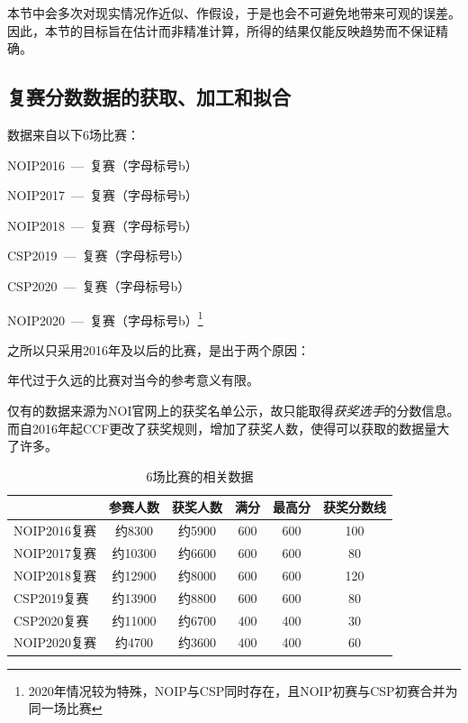     本节中会多次对现实情况作近似、作假设，于是也会不可避免地带来可观的误差。因此，本节的目标旨在估计而非精准计算，所得的结果仅能反映趋势而不保证精确。

    \subsection{复赛分数数据的获取、加工和拟合}\label{sec:dataPreprocessingOfNOIP}

        数据来自以下6场比赛：
        \begin{asparaitem}
            \item NOIP2016\ ---\ 复赛（字母标号b）
            \item NOIP2017\ ---\ 复赛（字母标号b）
            \item NOIP2018\ ---\ 复赛（字母标号b）
            \item CSP2019\ ---\ 复赛（字母标号b）
            \item CSP2020\ ---\ 复赛（字母标号b）
            \item NOIP2020\ ---\ 复赛（字母标号b）\footnote{2020年情况较为特殊，NOIP与CSP同时存在，且NOIP初赛与CSP初赛合并为同一场比赛}
        \end{asparaitem}

        \vspace{1.5ex}

        之所以只采用2016年及以后的比赛，是出于两个原因：
        \begin{asparaitem}
            \item 年代过于久远的比赛对当今的参考意义有限。
            \item 仅有的数据来源为NOI官网上的获奖名单公示，故只能取得\emph{获奖选手}的分数信息。而自2016年起CCF更改了获奖规则，增加了获奖人数，使得可以获取的数据量大了许多。
        \end{asparaitem}

        \vspace{1.5ex}

        \begin{table}\footnotesize
            \centering
            \begin{tabular}{@{}lccccc@{}}
                \toprule
                    & \multicolumn{1}{l}{参赛人数} & \multicolumn{1}{l}{获奖人数} & \multicolumn{1}{l}{满分} & \multicolumn{1}{l}{最高分} & \multicolumn{1}{l}{获奖分数线} \\ \midrule
                NOIP2016复赛 & 约8300  & 约5900 & 600 & 600 & 100 \\
                NOIP2017复赛 & 约10300 & 约6600 & 600 & 600 & 80  \\
                NOIP2018复赛 & 约12900 & 约8000 & 600 & 600 & 120 \\
                CSP2019复赛  & 约13900 & 约8800 & 600 & 600 & 80  \\
                CSP2020复赛  & 约11000 & 约6700 & 400 & 400 & 30  \\
                NOIP2020复赛 & 约4700  & 约3600 & 400 & 400 & 60  \\ \bottomrule
            \end{tabular}
            \caption{6场比赛的相关数据}
            \label{tab:noip16to20}
        \end{table}

